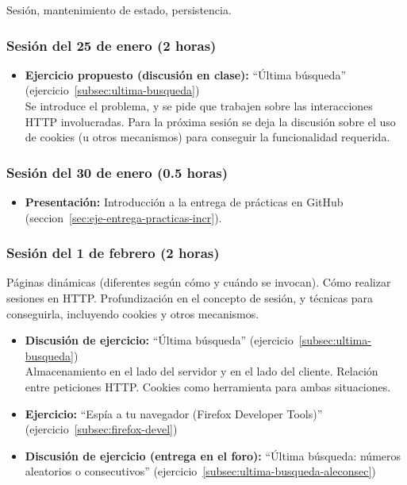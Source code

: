 \documentclass[a4paper,12pt]{article}
\begin{document}
Sesión, mantenimiento de estado, persistencia.

\subsubsection{Sesión del 25 de enero (2 horas)}

\begin{itemize}
\item \textbf{Ejercicio propuesto (discusión en clase):} ``Última búsqueda'' (ejercicio~\ref{subsec:ultima-busqueda}) \\
  Se introduce el problema, y se pide que trabajen sobre las interacciones HTTP involucradas. Para la próxima sesión se deja la discusión sobre el uso de cookies (u otros mecanismos) para conseguir la funcionalidad requerida.
\end{itemize}

\subsubsection{Sesión del 30 de enero (0.5 horas)}

\begin{itemize}
\item \textbf{Presentación:} Introducción a la entrega de prácticas en GitHub (seccion~\ref{sec:eje-entrega-practicas-incr}).
\end{itemize}


\subsubsection{Sesión del 1 de febrero (2 horas)}

Páginas dinámicas (diferentes según cómo y cuándo se invocan). Cómo realizar sesiones en HTTP. Profundización en el concepto de sesión, y técnicas para conseguirla, incluyendo cookies y otros mecanismos.

\begin{itemize}
\item \textbf{Discusión de ejercicio:} ``Última búsqueda'' (ejercicio~\ref{subsec:ultima-busqueda}) \\
  Almacenamiento en el lado del servidor y en el lado del cliente. Relación entre peticiones HTTP. Cookies como herramienta para ambas situaciones.
\item \textbf{Ejercicio:} ``Espía a tu navegador (Firefox Developer Tools)'' (ejercicio~\ref{subsec:firefox-devel})
\item \textbf{Discusión de ejercicio (entrega en el foro):} ``Última búsqueda: números aleatorios o consecutivos'' (ejercicio~\ref{subsec:ultima-busqueda-aleconsec})
\end{itemize}
\end{document}
